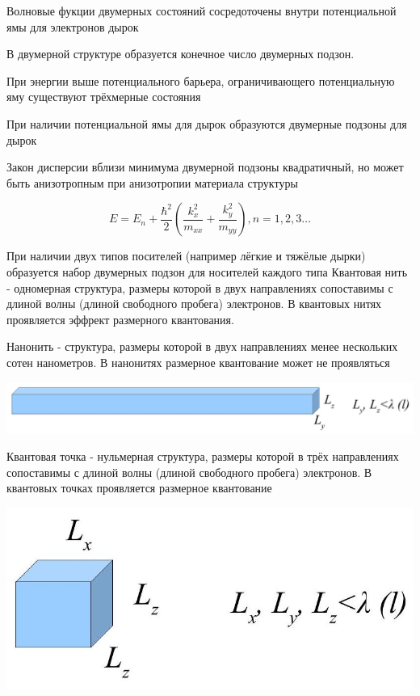 \documentclass[10pt]{article}
\begin{document}
Волновые фукции двумерных состояний сосредоточены внутри потенциальной ямы для электронов дырок

В двумерной структуре образуется конечное число двумерных подзон.

При энергии выше потенциального барьера, ограничивающего потенциальную яму существуют трёхмерные состояния

При наличии потенциальной ямы для дырок образуются двумерные подзоны для дырок

Закон дисперсии вблизи минимума двумерной подзоны квадратичный, но может быть анизотропным при анизотропии материала структуры

$$
E=E_{n}+\frac{\hbar^{2}}{2}\left(\frac{k_{x}^{2}}{m_{x x}}+\frac{k_{y}^{2}}{m_{y y}}\right), n=1,2,3 \ldots
$$

При наличии двух типов посителей (например лёгкие и тяжёлые дырки) образуется набор двумерных подзон для носителей каждого типа Квантовая нить - одномерная структура, размеры которой в двух направлениях сопоставимы с длиной волны (длиной свободного пробега) электронов. В квантовых нитях проявляется эффрект размерного квантования.

Нанонить - структура, размеры которой в двух направлениях менее нескольких сотен нанометров. В нанонитях размерное квантование может не проявляться

\begin{center}
\includegraphics[max width=\textwidth]{2023_05_21_66a3dfca5be088b7d6b7g-09}
\end{center}

Квантовая точка - нульмерная структура, размеры которой в трёх направлениях сопоставимы с длиной волны (длиной свободного пробега) электронов. В квантовых точках проявляется размерное квантование

\begin{center}
\includegraphics[max width=\textwidth]{2023_05_21_66a3dfca5be088b7d6b7g-09(1)}
\end{center}
\end{document}
